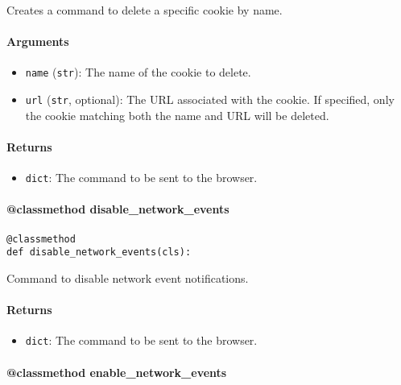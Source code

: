 \documentclass{article}
\begin{document}
\noindent Creates a command to delete a specific cookie by name.

\paragraph{Arguments}

\begin{itemize}
    \item \lstinline[style=pythonstyle]|name| (\lstinline[style=pythonstyle]|str|): The name of the cookie to delete.
    \item \lstinline[style=pythonstyle]|url| (\lstinline[style=pythonstyle]|str|, optional): The URL associated with the cookie. If specified, only the cookie matching both the name and URL will be deleted.
\end{itemize}

\paragraph{Returns}

\begin{itemize}
    \item \lstinline[style=pythonstyle]|dict|: The command to be sent to the browser.
\end{itemize}

\paragraph{@classmethod disable\_network\_events}

\begin{lstlisting}[style=pythonstyle]
@classmethod
def disable_network_events(cls):
\end{lstlisting}

\noindent Command to disable network event notifications.

\paragraph{Returns}

\begin{itemize}
    \item \lstinline[style=pythonstyle]|dict|: The command to be sent to the browser.
\end{itemize}

\paragraph{@classmethod enable\_network\_events}
\end{document}
